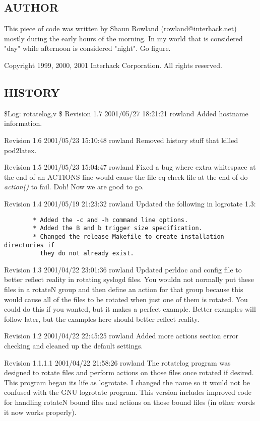 \documentclass{article}
\begin{document}
\subsection*{AUTHOR}
This piece of code was written by Shaun Rowland (rowland@interhack.net)
mostly during the early hours of the morning.  In my world that is
considered "day" while afternoon is considered "night".  Go figure.

Copyright 1999, 2000, 2001 Interhack Corporation.  All rights reserved.

\subsection*{HISTORY}%

\$Log: rotatelog,v \$
Revision 1.7  2001/05/27 18:21:21  rowland
Added hostname information.

Revision 1.6  2001/05/23 15:10:48  rowland
Removed history stuff that killed pod2latex.

Revision 1.5  2001/05/23 15:04:47  rowland
Fixed a bug where extra whitespace at the end of an ACTIONS line would cause
the file eq check file at the end of do {\em action()\/} to fail.  Doh!  Now we
are good to go.

Revision 1.4  2001/05/19 21:23:32  rowland
Updated the following in logrotate 1.3:
\begin{verbatim}
        * Added the -c and -h command line options.
        * Added the B and b trigger size specification.
        * Changed the release Makefile to create installation directories if
          they do not already exist.
\end{verbatim}

Revision 1.3  2001/04/22 23:01:36  rowland
Updated perldoc and config file to better reflect reality in rotating
syslogd files.  You wouldn not normally put these files in a rotateN group
and then define an action for that group because this would cause all of
the files to be rotated when just one of them is rotated.  You could do
this if you wanted, but it makes a perfect example.  Better examples will
follow later, but the examples here should better reflect reality.

Revision 1.2  2001/04/22 22:45:25  rowland
Added more actions section error checking and cleaned up the default settings.

Revision 1.1.1.1  2001/04/22 21:58:26  rowland
The rotatelog program was designed to rotate files and perform actions on
those files once rotated if desired.  This program began its life as
logrotate.  I changed the name so it would not be confused with the GNU
logrotate program.  This version includes improved code for handling
rotateN bound files and actions on those bound files (in other words it
now works properly).
\end{document}
